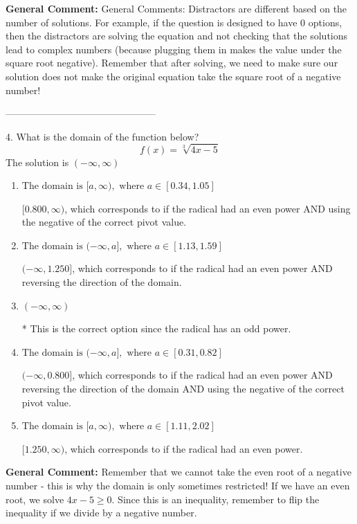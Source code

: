 \documentclass{extbook}[14pt]
\begin{document}
\textbf{General Comment:} General Comments: Distractors are different based on the number of solutions. For example, if the question is designed to have 0 options, then the distractors are solving the equation and not checking that the solutions lead to complex numbers (because plugging them in makes the value under the square root negative). Remember that after solving, we need to make sure our solution does not make the original equation take the square root of a negative number! 

-----------------------------------------------

4. What is the domain of the function below?
\[ f(x) = \sqrt[3]{4 x - 5} \] 
The solution is $ (-\infty, \infty) $ 

\begin{enumerate}[label=\Alph*.] 
\item $ \text{The domain is } [a, \infty), \text{   where } a \in [0.34, 1.05] $ 

 $[0.800, \infty)$, which corresponds to if the radical had an even power AND using the negative of the correct pivot value. 
\item $ \text{The domain is } (-\infty, a], \text{   where } a \in [1.13, 1.59] $ 

 $(-\infty, 1.250]$, which corresponds to if the radical had an even power AND reversing the direction of the domain. 
\item $ (-\infty, \infty) $ 

 * This is the correct option since the radical has an odd power. 
\item $ \text{The domain is } (-\infty, a], \text{   where } a \in [0.31, 0.82] $ 

 $(-\infty, 0.800]$, which corresponds to if the radical had an even power AND reversing the direction of the domain AND using the negative of the correct pivot value. 
\item $ \text{The domain is } [a, \infty), \text{   where } a \in [1.11, 2.02] $ 

 $[1.250, \infty)$, which corresponds to if the radical had an even power. 
\end{enumerate} 
 
\textbf{General Comment:} Remember that we cannot take the even root of a negative number - this is why the domain is only sometimes restricted! If we have an even root, we solve $4 x - 5 \geq 0$. Since this is an inequality, remember to flip the inequality if we divide by a negative number. 
\end{document}
